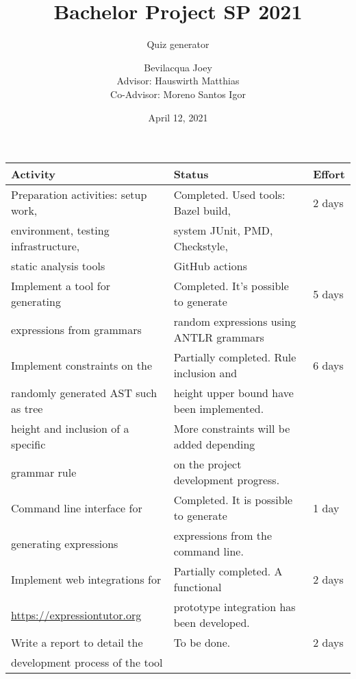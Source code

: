 \documentclass[t,aspectratio=169]{beamer}
\title{Bachelor Project SP 2021}
\subtitle{Quiz generator}
\author{Bevilacqua Joey\\Advisor: Hauswirth Matthias\\Co-Advisor: Moreno Santos Igor}
\institute{Universit\`a della Svizzera Italiana}
\date{April 12, 2021}
\begin{document}
\begin{frame}
\maketitle
\end{frame}

\begin{frame}
\begin{center}
\begin{tabular}{lll}
\textbf{Activity}                    & \textbf{Status}                           & \textbf{Effort} \\\hline
Preparation activities: setup work,  & Completed. Used tools: Bazel build,       & 2 days          \\
environment, testing infrastructure, & system JUnit, PMD, Checkstyle,            &                 \\
static analysis tools                & GitHub actions                            &                 \\\hline
Implement a tool for generating      & Completed. It's possible to generate      & 5 days          \\
expressions from grammars            & random expressions using ANTLR grammars   &                 \\\hline
Implement constraints on the         & Partially completed. Rule inclusion and   & 6 days          \\
randomly generated AST such as tree  & height upper bound have been implemented. &                 \\
height and inclusion of a specific   & More constraints will be added depending  &                 \\
grammar rule                         & on the project development progress.      &                 \\\hline
Command line interface for           & Completed. It is possible to generate     & 1 day           \\
generating expressions               & expressions from the command line.        &                 \\\hline
Implement web integrations for       & Partially completed. A functional         & 2 days          \\
\url{https://expressiontutor.org}    & prototype integration has been developed. &                 \\\hline
Write a report to detail the         & To be done.                               & 2 days          \\
development process of the tool      &                                           &                 \\\hline
\end{tabular}
\end{center}
\end{frame}
\end{document}
